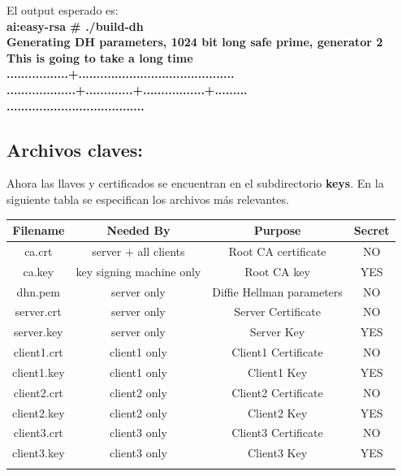 \documentclass[a4paper, 12pt, usenames]{article}
\newcommand\tab[1][1cm]{\hspace*{#1}}
\begin{document}
El output esperado es:\\
\textbf{
\tab ai:easy-rsa \# ./build-dh\\
\tab Generating DH parameters, 1024 bit long safe prime, generator 2\\
\tab This is going to take a long time\\
\tab .................+...........................................\\
\tab ...................+.............+.................+.........\\
\tab ......................................\\
}

\subsection{Archivos claves:}
Ahora las llaves y certificados se encuentran en el subdirectorio \textbf{keys}. En la siguiente tabla se especifican los archivos más relevantes.

\begin{table}[h]
\begin{center}
\begin{tabular}{|c|c|c|c|}
\hline
Filename & Needed By & Purpose & Secret\\
\hline
ca.crt&
server + all clients&
Root CA certificate&
NO\\
\hline
ca.key&
key signing machine only&
Root CA key&
YES\\
\hline
dh{n}.pem&
server only&
Diffie Hellman parameters&
NO\\
\hline
server.crt&
server only&
Server Certificate&
NO\\
\hline
server.key&
server only&
Server Key&
YES\\
\hline
client1.crt&
client1 only&
Client1 Certificate&
NO\\
\hline
client1.key&
client1 only&
Client1 Key&
YES\\
\hline
client2.crt&
client2 only&
Client2 Certificate&
NO\\
\hline
client2.key&
client2 only&
Client2 Key&
YES\\
\hline
client3.crt&
client3 only&
Client3 Certificate&
NO\\
\hline
client3.key&
client3 only&
Client3 Key&
YES\\ \\
\hline
\end{tabular}
\end{center}
\end{table}
\end{document}
